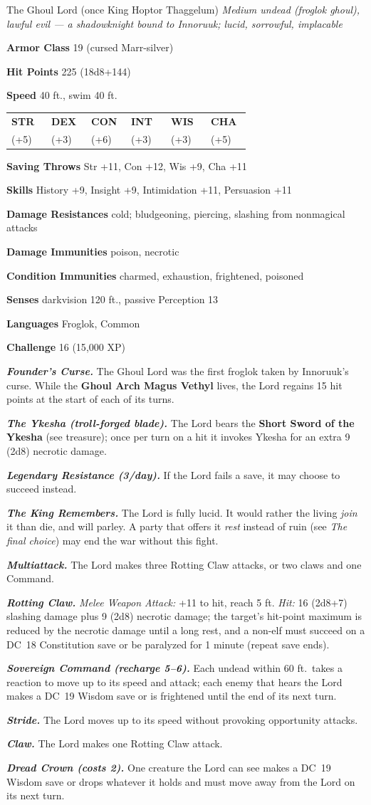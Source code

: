 \documentclass[10pt,twoside]{report}
\makeatletter
\newcommand{\msub}[1]{{\itshape #1}\par}
\newcommand{\mrule}{\par\vspace{2pt}{\color{gukred}\rule{\linewidth}{1.1pt}}\par\vspace{2pt}}
\newcommand{\mthin}{\par\vspace{1pt}{\color{gukred!60}\rule{\linewidth}{0.5pt}}\par\vspace{2pt}}
\newcommand{\mfield}[2]{\noindent\textbf{\color{gukred}#1} #2\par}
\newcommand{\mhead}[1]{\par\smallskip{\sffamily\bfseries\scshape\color{gukred}#1}\par
  \vspace{-3pt}{\color{gukred}\rule{\linewidth}{0.7pt}}\par\vspace{2pt}}
\newcommand{\mtrait}[2]{\noindent\textbf{\itshape #1} #2\par\vspace{2pt}}
\newcommand{\abilities}[6]{\par\smallskip\noindent
  {\setlength{\tabcolsep}{1.5pt}%
  \begin{tabular}{@{}*{6}{p{0.15\linewidth}}@{}}
  \centering\sffamily\bfseries\color{gukred}STR &\centering\sffamily\bfseries\color{gukred}DEX
  &\centering\sffamily\bfseries\color{gukred}CON &\centering\sffamily\bfseries\color{gukred}INT
  &\centering\sffamily\bfseries\color{gukred}WIS &\centering\arraybackslash\sffamily\bfseries\color{gukred}CHA\\
  \centering #1 &\centering #2 &\centering #3 &\centering #4 &\centering #5 &\centering\arraybackslash #6\\
  \end{tabular}}\par\smallskip}
\newcommand{\dc}[1]{DC~#1}
\makeatother
\begin{document}
\begin{statblock}{The Ghoul Lord (once King Hoptor Thaggelum)}
\msub{Medium undead (froglok ghoul), lawful evil --- \textnormal{a shadowknight bound to Innoruuk; lucid, sorrowful, implacable}}
\mrule
\mfield{Armor Class}{19 (cursed Marr-silver)}
\mfield{Hit Points}{225 (18d8+144)}
\mfield{Speed}{40 ft., swim 40 ft.}
\abilities{20 (+5)}{16 (+3)}{22 (+6)}{16 (+3)}{16 (+3)}{20 (+5)}
\mthin
\mfield{Saving Throws}{Str +11, Con +12, Wis +9, Cha +11}
\mfield{Skills}{History +9, Insight +9, Intimidation +11, Persuasion +11}
\mfield{Damage Resistances}{cold; bludgeoning, piercing, slashing from nonmagical attacks}
\mfield{Damage Immunities}{poison, necrotic}
\mfield{Condition Immunities}{charmed, exhaustion, frightened, poisoned}
\mfield{Senses}{darkvision 120 ft., passive Perception 13}
\mfield{Languages}{Froglok, Common}
\mfield{Challenge}{16 (15{,}000 XP)}
\mrule
\mtrait{Founder's Curse.}{The Ghoul Lord was the first froglok taken by Innoruuk's curse. While the \textbf{Ghoul Arch Magus Vethyl} lives, the Lord regains 15 hit points at the start of each of its turns.}
\mtrait{The Ykesha (troll-forged blade).}{The Lord bears the \textbf{Short Sword of the Ykesha} (see treasure); once per turn on a hit it invokes Ykesha for an extra 9 (2d8) necrotic damage.}
\mtrait{Legendary Resistance (3/day).}{If the Lord fails a save, it may choose to succeed instead.}
\mtrait{The King Remembers.}{The Lord is fully lucid. It would rather the living \emph{join} it than die, and will parley. A party that offers it \emph{rest} instead of ruin (see \textit{The final choice}) may end the war without this fight.}
\mhead{Actions}
\mtrait{Multiattack.}{The Lord makes three Rotting Claw attacks, or two claws and one Command.}
\mtrait{Rotting Claw.}{\textit{Melee Weapon Attack:} +11 to hit, reach 5 ft. \textit{Hit:} 16 (2d8+7) slashing damage plus 9 (2d8) necrotic damage; the target's hit-point maximum is reduced by the necrotic damage until a long rest, and a non-elf must succeed on a \dc{18} Constitution save or be paralyzed for 1 minute (repeat save ends).}
\mtrait{Sovereign Command (recharge 5--6).}{Each undead within 60 ft.\ takes a reaction to move up to its speed and attack; each enemy that hears the Lord makes a \dc{19} Wisdom save or is frightened until the end of its next turn.}
\mhead{Legendary Actions (3/round)}
\mtrait{Stride.}{The Lord moves up to its speed without provoking opportunity attacks.}
\mtrait{Claw.}{The Lord makes one Rotting Claw attack.}
\mtrait{Dread Crown (costs 2).}{One creature the Lord can see makes a \dc{19} Wisdom save or drops whatever it holds and must move away from the Lord on its next turn.}
\end{statblock}
\end{document}
